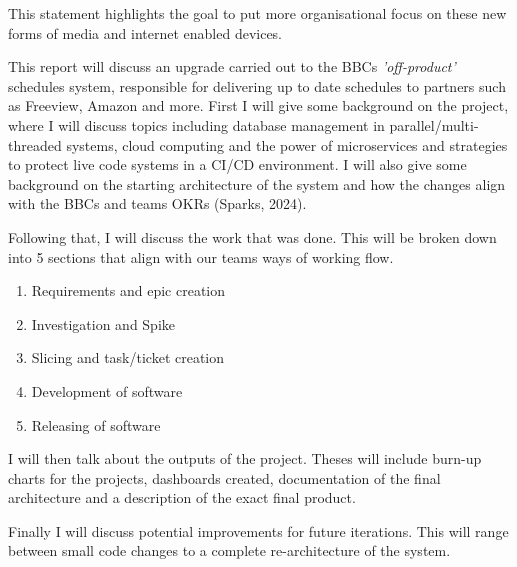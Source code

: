   This statement highlights the goal to put more organisational focus on these new forms of media and internet enabled devices. 
  
  This report will discuss an upgrade carried out to the BBCs \textit{'off-product'} schedules system, responsible for delivering up to date schedules to
  partners such as Freeview, Amazon and more. First I will give some background on the project, where I will discuss topics including database
  management in parallel/multi-threaded systems, cloud computing and the power of microservices and strategies to protect live code systems in a CI/CD
  environment. I will also give some background on the starting architecture of the system and how the changes align with the BBCs and teams OKRs (Sparks, 2024).
  
  Following that, I will discuss the work that was done. This will be broken down into 5 sections that align with our teams ways of working flow.
  \begin{enumerate}
    \item Requirements and epic creation
    \item Investigation and Spike
    \item Slicing and task/ticket creation
    \item Development of software
    \item Releasing of software
  \end{enumerate}

  I will then talk about the outputs of the project. Theses will include burn-up charts for the projects, dashboards created, documentation of the final 
  architecture and a description of the exact final product.

  Finally I will discuss potential improvements for future iterations. This will range between small code changes to a complete re-architecture of the system.
\newpage
